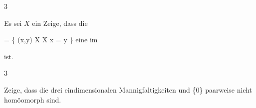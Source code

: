 {3}
{

Es sei $X$ ein
Zeige, dass die

\mavergleichskettedisp
{\vergleichskette
{ \triangle
}
{ =} { \left\{ (x,y) \in X \times X  \mid   x = y        \right\}
}
{ } {
}
{ } {
}
{ } {
}
}
{}{}{}
eine
im

 ist.

}
{} {}

{3}
{

Zeige, dass die drei eindimensionalen Mannigfaltigkeiten
 {} {\R} {und} {\R \setminus \{0\}} {}
paarweise nicht homöomorph sind.

}
{} {}

